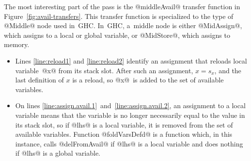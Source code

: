 \documentclass[blockstyle,preprint,natbib,nocopyrightspace]{sigplanconf}
\newcommand\linepairref[2]{lines \ref{line:#1}~and~\ref{line:#2}}
\newcommand\slotof[1]{\ensuremath{s_{#1}}}
\def\finalremark#1{\relax}
\newcommand\figref[1]{Figure~\ref{fig:#1}}
\begin{document}
The most interesting part of the pass is the @middleAvail@ transfer
function in \figref{avail-transfers}.\finalremark
{Let us revise the paper to pretend that global variables
don't exist.}
This transfer function is specialized to the type of @Middle@ node
used in~GHC.
In~GHC, a~middle node is either @MidAssign@, which assigns to a local
or global variable, or @MidStore@, which assigns to memory.
\par
\ifpagetuning{\enlargethispage{\baselineskip}}\fi
\begin{itemize}
\item
Lines \ref{line:reload1} and \ref{line:reload2}
identify an assignment that reloads local
variable~@x@ from its stack slot.\finalremark{I propose the compiler be
modified to use @isStackSlotOf@ as I've written. JD~approves.}
After such an assignment, $x = \slotof x$,
and the last definition of $x$ is a reload,
so @x@~is added to the set of available variables.
\item
On \linepairref{assign.avail.1}{assign.avail.2},
an assignment to a local variable means that the
variable is no longer necessarily equal to the value in its stack
slot, so if @lhs@ is a local variable, it is removed from the set of
available variables.
Function @foldVarsDefd@ is a function which, in this
instance, calls @delFromAvail@ if @lhs@ is a local variable and does
nothing if @lhs@ is a global variable.

\ifpagetuning\smallskip\fi  


\end{itemize}
\end{document}

